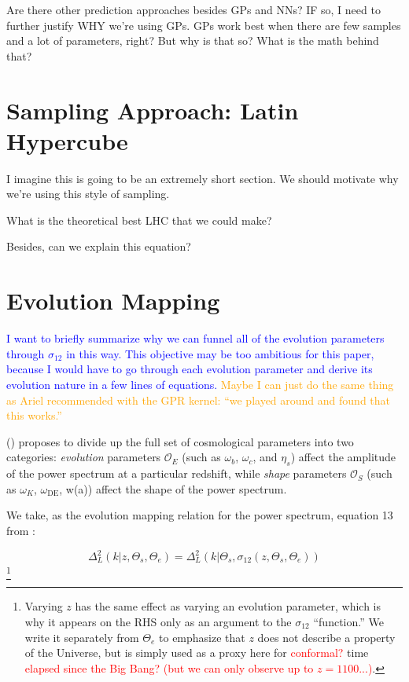 Are there other prediction approaches besides GPs and NNs? IF so, I need to
further justify WHY we’re using GPs.
GPs work best when there are few samples and a lot of parameters, right?
But why is that so? What is the math behind that?


\section{Sampling Approach: Latin Hypercube}
\label{sec: lhc_theory}

I imagine this is going to be an extremely short section. We should motivate why we're using this style of sampling.

What is the theoretical best LHC that we could make?

Besides, can we explain this equation?


\section{Evolution Mapping}
\label{sec: ev_mapping_intro}

\textcolor{blue}{I want to briefly summarize why we can funnel all of the 
evolution parameters through $\sigma_{12}$ in this way. This objective may be
too ambitious for this paper, because I would have to go through each
evolution parameter and derive its evolution nature in a few lines of 
equations.} \textcolor{orange}{Maybe I can just do the same thing as Ariel
recommended with the GPR kernel: ``we played around and found that this
works.''}

() proposes to divide up the full set of cosmological
parameters into two categories: \textit{evolution} parameters $\mathcal{O}_E$
(such as $\omega_b$, $\omega_c$, and $\eta_s$)
affect the amplitude of the power spectrum at a particular redshift, while
\textit{shape} parameters $\mathcal{O}_S$
(such as $\omega_K$, $\omega_\text{DE}$, w(a))
affect the shape of the power
spectrum.

We take, as the evolution mapping relation for the power spectrum, equation 13
from :

\begin{equation}
\label{eq: evMapping_pSpectrum}
    \Delta^2_L (k | z, \Theta_s, \Theta_e)
    =
    \Delta_L^2 (k | \Theta_s, \sigma_{12} \left( z, \Theta_s, \Theta_e \right))
\end{equation}\footnote{Varying $z$ has the same effect as varying an
evolution parameter, which is why it appears on the RHS only as an argument to
the $\sigma_{12}$ ``function.'' We write it separately from $\Theta_e$ to
emphasize that $z$ does not describe a property of the Universe, but is
simply used as a proxy here for \textcolor{red}{conformal?} time
\textcolor{red}{elapsed since the Big Bang? (but we can only observe up to
$z = 1100$...)}.}

